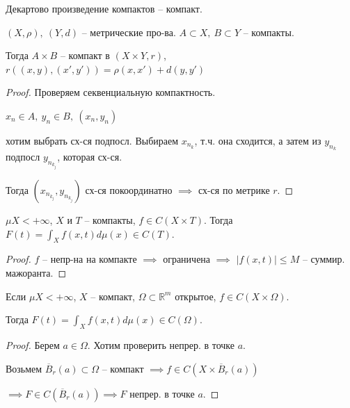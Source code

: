 \begin{lemma}
    Декартово произведение компактов -- компакт.

    $(X, \rho), \ (Y, d)$ -- метрические про-ва. $A \subset X, \ B \subset Y$ -- компакты.

    Тогда $A \times B$ -- компакт в $(X \times Y, r)$, $r\left((x, y), (x', y')\right) = \rho(x, x') + d(y, y')$
\end{lemma}
\begin{proof}
    Проверяем секвенциальную компактность.

    $x_n \in A, \ y_n \in B, \ (x_n, y_n)$

    хотим выбрать сх-ся подпосл. Выбираем $x_{n_k}$, т.ч. она сходится, а затем из $y_{n_k}$ подпосл $y_{n_{k_j}}$, которая сх-ся.

    Тогда $(x_{n_{k_j}}, y_{n_{k_j}})$ сх-ся покоординатно $\implies$ сх-ся по метрике $r$.
\end{proof}

\begin{theorem}
    $\mu X < +\infty$, $X$ и $T$ -- компакты, $f \in C(X \times T)$. Тогда $F(t) = \int_{X} {f(x, t)d \mu(x)} \in C(T)$. 
\end{theorem}
\begin{proof}
    $f$ -- непр-на на компакте $\implies$ ограничена $\implies$ $| f(x, t) | \leq M$ -- суммир. мажоранта.
\end{proof}
\begin{consequence}
    Если $\mu X < +\infty$, $X$ -- компакт, $\Omega \subset \mathbb{R}^m$ открытое, $f \in C(X \times \Omega)$.

    Тогда $F(t) = \int_{X} {f(x, t) d \mu(x)} \in C(\Omega)$.
\end{consequence}
\begin{proof}
    Берем $a \in \Omega$. Хотим проверить непрер. в точке $a$.

    Возьмем $\overline{B}_r(a) \subset \Omega$ -- компакт $\implies f \in C(X \times \overline{B}_r(a))$


    $\implies F \in C(\overline{B}_r(a)) \implies F$ непрер. в точке $a$.
\end{proof}

